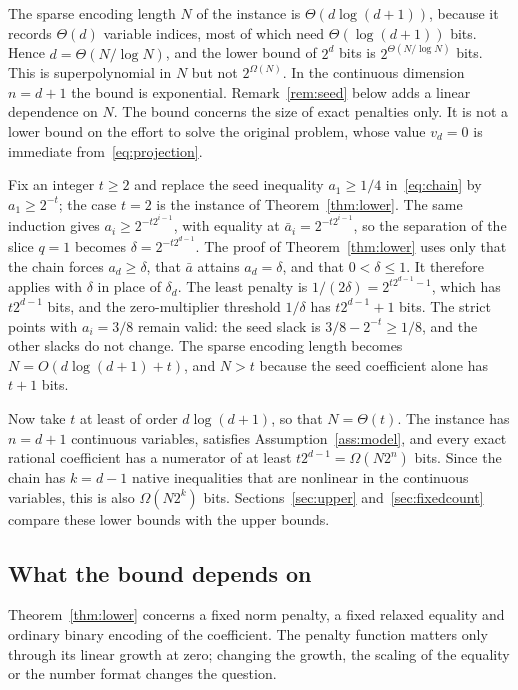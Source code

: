 \begin{remark}
The sparse encoding length $N$ of the instance is $\Theta(d\log(d+1))$,
because it records $\Theta(d)$ variable indices, most of which need
$\Theta(\log(d+1))$ bits. Hence $d=\Theta(N/\log N)$, and the lower
bound of $2^d$ bits is $2^{\Theta(N/\log N)}$ bits. This is
superpolynomial in $N$ but not $2^{\Omega(N)}$. In the continuous dimension $n=d+1$ the bound is
exponential. Remark~\ref{rem:seed} below adds a linear dependence on $N$.
The bound concerns the size of exact penalties only. It is not a lower
bound on the effort to solve the original problem, whose value $v_d=0$ is
immediate from~\eqref{eq:projection}.
\end{remark}

\begin{remark}\label{rem:seed}
Fix an integer $t\ge2$ and replace the seed inequality $a_1\ge1/4$
in~\eqref{eq:chain} by $a_1\ge2^{-t}$; the case $t=2$ is the instance of
Theorem~\ref{thm:lower}. The same induction gives
$a_i\ge2^{-t2^{i-1}}$, with equality at $\bar a_i=2^{-t2^{i-1}}$, so the
separation of the slice $q=1$ becomes $\delta=2^{-t2^{d-1}}$. The proof of
Theorem~\ref{thm:lower} uses only that the chain forces $a_d\ge\delta$,
that $\bar a$ attains $a_d=\delta$, and that $0<\delta\le1$. It therefore
applies with $\delta$ in place of $\delta_d$. The least penalty is
$1/(2\delta)=2^{t2^{d-1}-1}$, which has $t2^{d-1}$ bits, and the
zero-multiplier threshold $1/\delta$ has $t2^{d-1}+1$ bits. The strict
points with $a_i=3/8$ remain valid: the seed slack is
$3/8-2^{-t}\ge1/8$, and the other slacks do not change. The sparse
encoding length becomes $N=O(d\log(d+1)+t)$, and $N>t$ because the seed
coefficient alone has $t+1$ bits.

Now take $t$ at least of order $d\log(d+1)$, so that $N=\Theta(t)$. The
instance has $n=d+1$ continuous variables, satisfies
Assumption~\ref{ass:model}, and every exact rational coefficient has a
numerator of at least $t2^{d-1}=\Omega(N2^n)$ bits. Since the chain
has $k=d-1$ native inequalities that are nonlinear in the continuous
variables, this is also $\Omega(N2^k)$ bits. Sections~\ref{sec:upper}
and~\ref{sec:fixedcount} compare these lower bounds with the upper
bounds.
\end{remark}

\subsection{What the bound depends on}\label{sec:lower-scope}
Theorem~\ref{thm:lower} concerns a fixed norm penalty, a fixed relaxed
equality and ordinary binary encoding of the coefficient. The penalty
function matters only through its linear growth at zero; changing the
growth, the scaling of the equality or the number format changes the
question.

